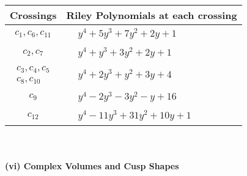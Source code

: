 \documentclass[1p]{elsarticle_modified}
\theoremstyle{definition}
\begin{document}
\begin{tabular}{m{50pt}|m{274pt}}
Crossings & \hspace{64pt}Riley Polynomials at each crossing \\
\hline $$\begin{aligned}c_{1},c_{6},c_{11}\end{aligned}$$&$\begin{aligned}
&y^4+5 y^3+7 y^2+2 y+1
\end{aligned}$\\
\hline $$\begin{aligned}c_{2},c_{7}\end{aligned}$$&$\begin{aligned}
&y^4+y^3+3 y^2+2 y+1
\end{aligned}$\\
\hline $$\begin{aligned}c_{3},c_{4},c_{5}\\c_{8},c_{10}\end{aligned}$$&$\begin{aligned}
&y^4+2 y^3+y^2+3 y+4
\end{aligned}$\\
\hline $$\begin{aligned}c_{9}\end{aligned}$$&$\begin{aligned}
&y^4-2 y^3-3 y^2- y+16
\end{aligned}$\\
\hline $$\begin{aligned}c_{12}\end{aligned}$$&$\begin{aligned}
&y^4-11 y^3+31 y^2+10 y+1
\end{aligned}$\\
\hline
\end{tabular}\\~\\
\newpage\flushleft \textbf{(vi) Complex Volumes and Cusp Shapes}
\end{document}
